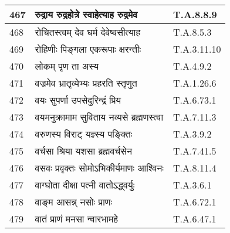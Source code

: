\documentclass[17pt]{extarticle}
\begin{document}
\begin{longtable}{||p{0.4in}||p{4.9in}||p{0.9in}||}
    \hline
        
    467 & रुद्राय रुद्रहोत्रे स्वाहेत्याह रुद्रमेव & T.A.8.8.9       \\
    
    \hline
        
    468 & रोचितस्त्वम् देव घर्म देवेष्वसीत्याह & T.A.8.5.3       \\
    
    \hline
        
    469 & रोहिणीः पिङ्गला एकरूपाः क्षरन्तीः & T.A.3.11.10       \\
    
    \hline
        
    470 & लोकम् पृण ता अस्य & T.A.4.9.2       \\
    
    \hline
        
    471 & वज्रमेव भ्रातृव्येभ्यः प्रहरति स्तृणुत & T.A.1.26.6       \\
    
    \hline
        
    472 & वयः सुपर्णा उपसेदुरिन्द्रं प्रिय & T.A.6.73.1       \\
    
    \hline
        
    473 & वयमनुक्रामाम सुविताय नव्यसे ब्रह्मणस्त्वा & T.A.7.11.3       \\
    
    \hline
        
    474 & वरुणस्य विराट् यज्ञ्स्य पङ्क्तिः & T.A.3.9.2       \\
    
    \hline
        
    475 & वर्चसा श्रिया यशसा ब्रह्मवर्चसेन & T.A.7.41.5       \\
    
    \hline
        
    476 & वसवः प्रवृक्तः सोमोऽभिकीर्यमाणः आश्विनः & T.A.8.11.4       \\
    
    \hline
        
    477 & वाग्घोता दीक्षा पत्नी वातोऽद्ध्वर्युः & T.A.3.6.1       \\
    
    \hline
        
    478 & वाङ्म आसन्न् नसोः प्राणः & T.A.6.72.1       \\
    
    \hline
        
    479 & वातं प्राणं मनसा न्वारभामहे & T.A.6.47.1       \\
    

\end{longtable}
\end{document}
